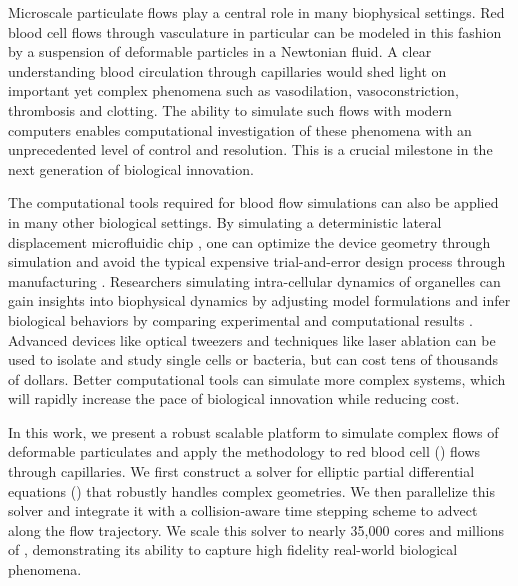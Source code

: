 
Microscale particulate flows play a central role in many biophysical settings.
Red blood cell flows through vasculature in particular can be modeled in this fashion by a suspension of deformable particles in a Newtonian fluid.
A clear understanding blood circulation through capillaries would shed light on important yet complex phenomena such as vasodilation, vasoconstriction, thrombosis and clotting.
The ability to simulate such flows with modern computers enables computational investigation of these phenomena with an unprecedented level of control and resolution. 
This is a crucial milestone in the next generation of biological innovation.

The computational tools required for blood flow simulations can also be applied in many other biological settings.
By simulating a deterministic lateral displacement microfluidic chip \cite{mcgrath2014deterministic}, one can optimize the device geometry through simulation and avoid the typical expensive trial-and-error design process through manufacturing \cite{kabacaouglu2019sorting}.
Researchers simulating intra-cellular dynamics of organelles can gain insights into biophysical dynamics by adjusting model formulations and infer biological behaviors by comparing experimental and computational results \cite{nazockdast2017cytoplasmic}. 
Advanced devices like optical tweezers \cite{zhong2013trapping} and techniques like laser ablation \cite{yu2014measuring} can be used to isolate and study single cells or bacteria, but can cost tens of thousands of dollars.
Better computational tools can simulate more complex systems, which will rapidly increase the pace of biological innovation while reducing cost.

In this work, we present a robust scalable platform to simulate complex flows of deformable particulates and apply the methodology to red blood cell (\rbc) flows through capillaries. 
We first construct a solver for elliptic partial differential equations (\pdes) that robustly handles complex geometries.
We then parallelize this solver and integrate it with a collision-aware time stepping scheme to advect \rbcs along the flow trajectory.
We scale this solver to nearly 35,000 cores and millions of \rbcs, demonstrating its ability to capture high fidelity real-world biological phenomena.

